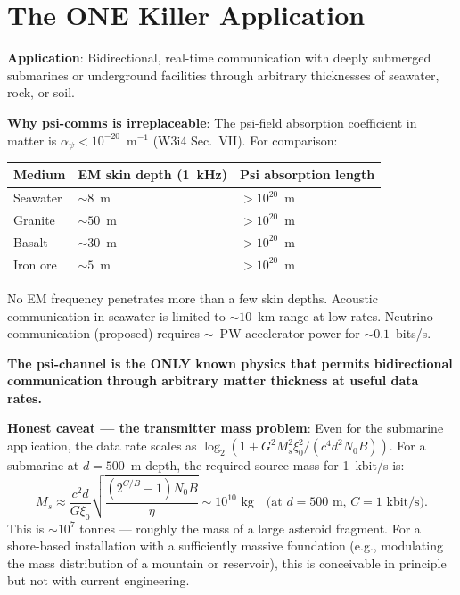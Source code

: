 \documentclass[11pt]{article}
\theoremstyle{definition}
\theoremstyle{remark}
\begin{document}
\section{The ONE Killer Application}
\label{sec:killer_app}

\begin{tcolorbox}[colback=green!5!white, colframe=green!50!black,
  title=\textbf{THE ONE KILLER APPLICATION: Submarine/Underground Communication}]

\textbf{Application}: Bidirectional, real-time communication with deeply
submerged submarines or underground facilities through arbitrary thicknesses
of seawater, rock, or soil.

\textbf{Why psi-comms is irreplaceable}: The psi-field absorption
coefficient in matter is $\alpha_\psi < 10^{-20}$~m$^{-1}$ (W3i4
Sec.~VII). For comparison:
\begin{center}
\begin{tabular}{lll}
\toprule
Medium & EM skin depth (1~kHz) & Psi absorption length \\
\midrule
Seawater & $\sim 8$~m & $>10^{20}$~m \\
Granite & $\sim 50$~m & $>10^{20}$~m \\
Basalt & $\sim 30$~m & $>10^{20}$~m \\
Iron ore & $\sim 5$~m & $>10^{20}$~m \\
\bottomrule
\end{tabular}
\end{center}

No EM frequency penetrates more than a few skin depths. Acoustic
communication in seawater is limited to $\sim 10$~km range at low
rates. Neutrino communication (proposed) requires $\sim$~PW accelerator
power for $\sim 0.1$~bits/s.

\textbf{The psi-channel is the ONLY known physics that permits
bidirectional communication through arbitrary matter thickness at
useful data rates.}

\textbf{Honest caveat --- the transmitter mass problem}: Even for the
submarine application, the data rate scales as $\log_2(1 + G^2 M_s^2
\xi_0^2/(c^4 d^2 N_0 B))$. For a submarine at $d = 500$~m depth, the
required source mass for 1~kbit/s is:
\begin{equation}
M_s \approx \frac{c^2 d}{G\xi_0}\sqrt{\frac{(2^{C/B}-1)N_0 B}{\eta}}
\sim 10^{10}\text{~kg} \quad\text{(at $d = 500$~m, $C = 1$~kbit/s)}.
\end{equation}
This is $\sim 10^7$ tonnes --- roughly the mass of a large asteroid
fragment. For a shore-based installation with a sufficiently massive
foundation (e.g., modulating the mass distribution of a mountain or
reservoir), this is conceivable in principle but not with current
engineering.


\end{tcolorbox}
\end{document}
